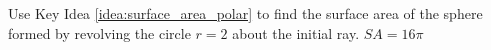 {Use Key Idea \ref{idea:surface_area_polar} to find the surface area of the sphere formed by revolving the circle $r=2$ about the initial ray.
}
{$SA = 16\pi$
}
